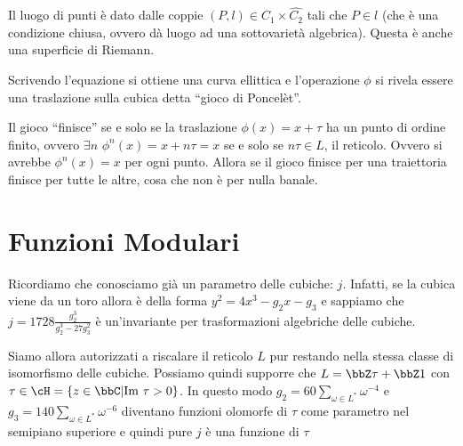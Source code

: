 Il luogo di punti è dato dalle coppie $(P, l) \in C_1 \times \hat{C_2}$
tali che $P \in l$ (che è una condizione chiusa, ovvero dà luogo ad una
sottovarietà algebrica). Questa è anche una superficie di Riemann.

Scrivendo l'equazione si ottiene una curva ellittica e l'operazione
$\phi$ si rivela essere una traslazione sulla cubica detta ``gioco di
Poncelèt''.

Il gioco ``finisce'' se e solo se la traslazione $\phi(x) = x + \tau$ ha
un punto di ordine finito, ovvero $\exists n$
$\phi^n (x) = x + n\tau = x$ se e solo se $n\tau \in L$, il
reticolo. Ovvero si avrebbe $\phi^n(x) = x$ per ogni punto. Allora se il
gioco finisce per una traiettoria finisce per tutte le altre, cosa che
non è per nulla banale.


\section{Funzioni Modulari}


\begin{osservazione}
  Ricordiamo che conosciamo già un parametro delle cubiche:
  $j$. Infatti, se la cubica viene da un toro allora è della forma
  $y^2 = 4 x^3 - g_2 x - g_3$ e sappiamo che
  $j = 1728 \frac{g_2^3}{g_2^3 - 27 g_3^2}$ è un'invariante per
  trasformazioni algebriche delle cubiche.
\end{osservazione}

Siamo allora autorizzati a riscalare il reticolo $L$ pur restando nella
stessa classe di isomorfismo delle cubiche. Possiamo quindi supporre che
$L = \bbZ \tau + \bbZ 1$ con $\tau \in \cH = \{ z \in \bbC | \Img \tau >
0 \}$. In questo modo $g_2 = 60 \sum_{\omega \in L^*} \omega^{-4}$ e
$g_3 = 140 \sum_{\omega \in L^*} \omega^{-6}$ diventano funzioni
olomorfe di $\tau$ come parametro nel semipiano superiore e quindi pure
$j$ è una funzione di $\tau$

